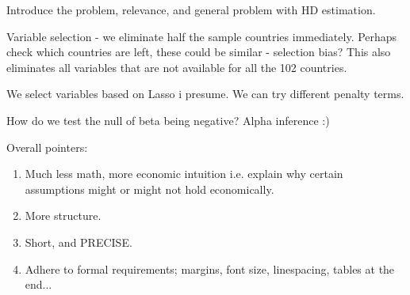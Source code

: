 
Introduce the problem, relevance, and general problem with HD estimation. 

Variable selection - we eliminate half the sample countries immediately. Perhaps check which countries are left, these could be similar - selection bias? This also eliminates all variables that are not available for all the 102 countries. 

We select variables based on Lasso i presume. We can try different penalty terms. 

How do we test the null of beta being negative? Alpha inference :) 

Overall pointers: 
\begin{enumerate}
    \item Much less math, more economic intuition i.e. explain why certain assumptions might or might not hold economically. 
    \item More structure. 
    \item Short, and PRECISE. 
    \item Adhere to formal requirements; margins, font size, linespacing, tables at the end... 
\end{enumerate}

